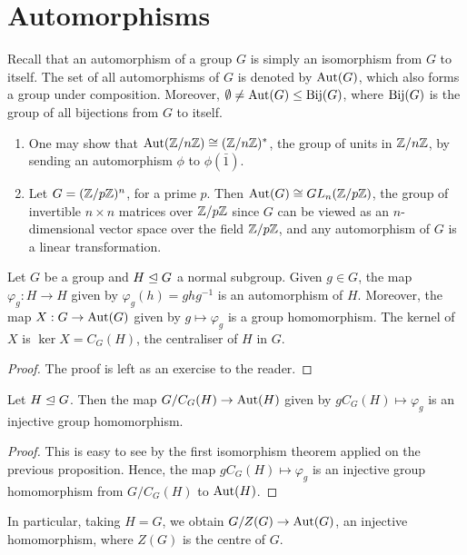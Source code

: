 \section{Automorphisms}

Recall that an automorphism of a group $G$ is simply an isomorphism from $G$ to itself. The set of all automorphisms of $G$ is denoted by $\operatorname{Aut}(G)$, which also forms a group under composition. Moreover, $\emptyset \neq \operatorname{Aut}(G) \leq \operatorname{Bij}(G)$, where $\operatorname{Bij}(G)$ is the group of all bijections from $G$ to itself.

\begin{example}
    \begin{enumerate}
        \item One may show that $\operatorname{Aut}(\mathbb{Z}/n\mathbb{Z}) \cong (\mathbb{Z}/n\mathbb{Z})^{\ast}$, the group of units in $\mathbb{Z}/n\mathbb{Z}$, by sending an automorphism $\phi$ to $\phi(\bar{1})$.
        \item Let $G = (\mathbb{Z}/p\mathbb{Z})^{n}$, for a prime $p$. Then $\operatorname{Aut}(G) \cong GL_{n}(\mathbb{Z}/p\mathbb{Z})$, the group of invertible $n \times n$ matrices over $\mathbb{Z}/p\mathbb{Z}$ since $G$ can be viewed as an $n$-dimensional vector space over the field $\mathbb{Z}/p\mathbb{Z}$, and any automorphism of $G$ is a linear transformation.
    \end{enumerate}
\end{example}

\begin{proposition}
    Let $G$ be a group and $H \trianglelefteq G$ a normal subgroup. Given $g \in G$, the map $\varphi_{g}:H \to H$ given by $\varphi_{g}(h) = ghg^{-1}$ is an automorphism of $H$. Moreover, the map $X:G \to \operatorname{Aut}(G)$ given by $g \mapsto \varphi_{g}$ is a group homomorphism. The kernel of $X$ is $\ker X = C_{G}(H)$, the centraliser of $H$ in $G$.
\end{proposition}
\begin{proof}
    The proof is left as an exercise to the reader.
\end{proof}

\begin{corollary}
    Let $H \trianglelefteq G$. Then the map $G/C_{G}(H) \to \operatorname{Aut}(H)$ given by $gC_{G}(H) \mapsto \varphi_{g}$ is an injective group homomorphism.
\end{corollary}
\begin{proof}
    This is easy to see by the first isomorphism theorem applied on the previous proposition. Hence, the map $gC_{G}(H) \mapsto \varphi_{g}$ is an injective group homomorphism from $G/C_{G}(H)$ to $\operatorname{Aut}(H)$.
\end{proof}
In particular, taking $H = G$, we obtain $G/Z(G) \to \operatorname{Aut}(G)$, an injective homomorphism, where $Z(G)$ is the centre of $G$.

